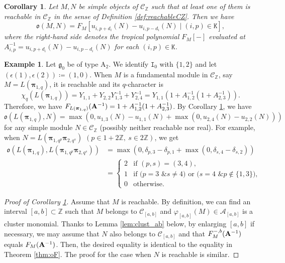 \documentclass[12pt]{amsart}
\newtheorem{corollary}[theorem]{Corollary}
\theoremstyle{definition}
\newtheorem{example}[theorem]{Example}
\theoremstyle{remark}
\numberwithin{equation}{section}
\begin{document}
\begin{corollary}\label{cor:oF2}
Let $M,N$ be simple objects of $\mathcal{C}_{\mathbb Z}$ such that at least one of them is reachable in $\mathcal{C}_{\mathbb Z}$ in the sense of Definition \ref{def:reachableCZ}. 
Then we have
\[ \mathfrak{o}(M,N) = F_{M}[u_{i,p+d_i}(N)-u_{i,p-d_i}(N) \mid (i,p) \in \mathtt{K}],\]
where the right-hand side denotes the tropical polynomial $F_M[-]$ evaluated at $A_{i,p}^{-1} = u_{i,p+d_i}(N)- u_{i,p-d_i}(N)$ for each $(i,p) \in \mathtt{K}$.
\end{corollary}

\begin{example}
Let $\mathfrak{g}_0$ be of type $\mathrm{A}_2$.
We identify $\mathtt{I}_0$ with $\{1,2\}$ and let $(\epsilon(1), \epsilon(2)) \coloneqq (1,0)$.
When $M$ is a fundamental module in $\mathcal{C}_{\mathbb Z}$, say $M= L(\boldsymbol{\pi}_{1,q})$,
it is reachable and its $q$-character is
\[ \chi_q(L(\boldsymbol{\pi}_{1,q})) = Y_{1,1} + Y_{2,2}Y^{-1}_{1,3} + Y^{-1}_{2,4} 
= Y_{1,1}(1+A^{-1}_{1,2}(1+A^{-1}_{2,3})).\]
Therefore, we have $F_{L(\boldsymbol{\pi}_{1,q})}({\bf A}^{-1}) = 1+A^{-1}_{1,2}(1+A^{-1}_{2,3})$.
By Corollary \ref{cor:oF2}, we have
\[ \mathfrak{o}(L(\boldsymbol{\pi}_{1,q}),N) = \max( 0, u_{1,3}(N)-u_{1,1}(N)+\max(0,u_{2,4}(N)-u_{2,2}(N)) )\]
for any simple module $N \in \mathcal{C}_{\mathbb Z}$ (possibly neither reachable nor real).
For example, when $N = L(\boldsymbol{\pi}_{1,q^p}\boldsymbol{\pi}_{2,q^s})$ $(p\in1+2\mathbb Z,\ s\in2\mathbb Z)$, we get
\begin{align*} \mathfrak{o}(L(\boldsymbol{\pi}_{1,q}),L(\boldsymbol{\pi}_{1,q^p}\boldsymbol{\pi}_{2,q^s})) &= \max( 0, \delta_{p,3}-\delta_{p,1}+\max(0,\delta_{s,4}-\delta_{s,2}) ) \\
&= \begin{cases}
2 & \text{if $(p,s) = (3,4)$}, \\
1 & \text{if ($p=3$ \& $s \neq 4$) or ($s = 4$ \& $p \not \in \{1,3 \}$)}, \\
0 & \text{otherwise}.
\end{cases}
\end{align*}
\end{example}

\begin{proof}[Proof of Corollary \ref{cor:oF2}]
Assume that $M$ is reachable.  
By definition, we can find an interval $[a,b] \subset \mathbb{Z}$ such that $M$ belongs to $\mathcal{C}_{[a,b]}$ and $\varphi_{[a,b]}(M) \in \mathcal{A}_{[a,b]}$ is a cluster monomial.
Thanks to Lemma \ref{lem:clust_ab} below, by enlarging $[a,b]$ if necessary, we may assume that $N$ also belongs to $\mathcal{C}_{[a,b]}$ and that $F_{M}^{-, b}({\bf A}^{-1})$ equals $F_{M}({\bf A}^{-1})$.   
Then, the desired equality is identical to the equality in Theorem \ref{thm:oF}. 
The proof for the case when $N$ is reachable is similar.
\end{proof}
\end{document}
